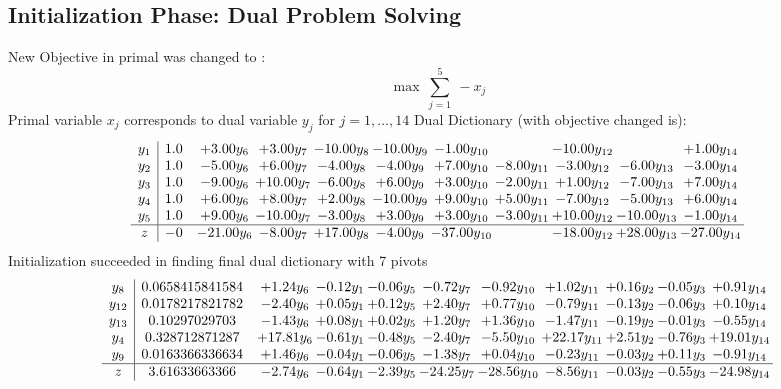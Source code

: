 \documentclass[9pt]{article}
\begin{document}
\subsection{Initialization Phase: Dual Problem Solving}
New Objective in primal was changed to : \[ \max\ \sum_{j=1}^{5}\ - x_j \] 
Primal variable $x_j$ corresponds to dual variable $y_j$ for $j = 1,\ldots,14$
Dual Dictionary (with objective changed is): 
\[\begin{array}{c| c c@{\hskip 2pt} c@{\hskip 2pt} c@{\hskip 2pt} c@{\hskip 2pt} c@{\hskip 2pt} c@{\hskip 2pt} c@{\hskip 2pt} c@{\hskip 2pt} c@{\hskip 2pt} }
 y_{1}   &  1.0 & +  3.00 y_{6} & +  3.00 y_{7} & -10.00 y_{8} & -10.00 y_{9} & -1.00 y_{10} &   & -10.00 y_{12} &   & +  1.00 y_{14}\\
 y_{2}   &  1.0 & -5.00 y_{6} & +  6.00 y_{7} & -4.00 y_{8} & -4.00 y_{9} & +  7.00 y_{10} & -8.00 y_{11} & -3.00 y_{12} & -6.00 y_{13} & -3.00 y_{14}\\
 y_{3}   &  1.0 & -9.00 y_{6} & + 10.00 y_{7} & -6.00 y_{8} & +  6.00 y_{9} & +  3.00 y_{10} & -2.00 y_{11} & +  1.00 y_{12} & -7.00 y_{13} & +  7.00 y_{14}\\
 y_{4}   &  1.0 & +  6.00 y_{6} & +  8.00 y_{7} & +  2.00 y_{8} & -10.00 y_{9} & +  9.00 y_{10} & +  5.00 y_{11} & -7.00 y_{12} & -5.00 y_{13} & +  6.00 y_{14}\\
 y_{5}   &  1.0 & +  9.00 y_{6} & -10.00 y_{7} & -3.00 y_{8} & +  3.00 y_{9} & +  3.00 y_{10} & -3.00 y_{11} & + 10.00 y_{12} & -10.00 y_{13} & -1.00 y_{14}\\
\hline
z    &  -0 & -21.00 y_{6} & -8.00 y_{7} & + 17.00 y_{8} & -4.00 y_{9} & -37.00 y_{10} &   & -18.00 y_{12} & + 28.00 y_{13} & -27.00 y_{14}\\
\end{array}\]
Initialization succeeded in finding final dual dictionary with 7 pivots
\[\begin{array}{c| c c@{\hskip 2pt} c@{\hskip 2pt} c@{\hskip 2pt} c@{\hskip 2pt} c@{\hskip 2pt} c@{\hskip 2pt} c@{\hskip 2pt} c@{\hskip 2pt} c@{\hskip 2pt} }
 y_{8}   &  0.0658415841584 & +  1.24 y_{6} & -0.12 y_{1} & -0.06 y_{5} & -0.72 y_{7} & -0.92 y_{10} & +  1.02 y_{11} & +  0.16 y_{2} & -0.05 y_{3} & +  0.91 y_{14}\\
 y_{12}   &  0.0178217821782 & -2.40 y_{6} & +  0.05 y_{1} & +  0.12 y_{5} & +  2.40 y_{7} & +  0.77 y_{10} & -0.79 y_{11} & -0.13 y_{2} & -0.06 y_{3} & +  0.10 y_{14}\\
 y_{13}   &  0.10297029703 & -1.43 y_{6} & +  0.08 y_{1} & +  0.02 y_{5} & +  1.20 y_{7} & +  1.36 y_{10} & -1.47 y_{11} & -0.19 y_{2} & -0.01 y_{3} & -0.55 y_{14}\\
 y_{4}   &  0.328712871287 & + 17.81 y_{6} & -0.61 y_{1} & -0.48 y_{5} & -2.40 y_{7} & -5.50 y_{10} & + 22.17 y_{11} & +  2.51 y_{2} & -0.76 y_{3} & + 19.01 y_{14}\\
 y_{9}   &  0.0163366336634 & +  1.46 y_{6} & -0.04 y_{1} & -0.06 y_{5} & -1.38 y_{7} & +  0.04 y_{10} & -0.23 y_{11} & -0.03 y_{2} & +  0.11 y_{3} & -0.91 y_{14}\\
\hline
z    &  3.61633663366 & -2.74 y_{6} & -0.64 y_{1} & -2.39 y_{5} & -24.25 y_{7} & -28.56 y_{10} & -8.56 y_{11} & -0.03 y_{2} & -0.55 y_{3} & -24.98 y_{14}\\
\end{array}\]
\end{document}
